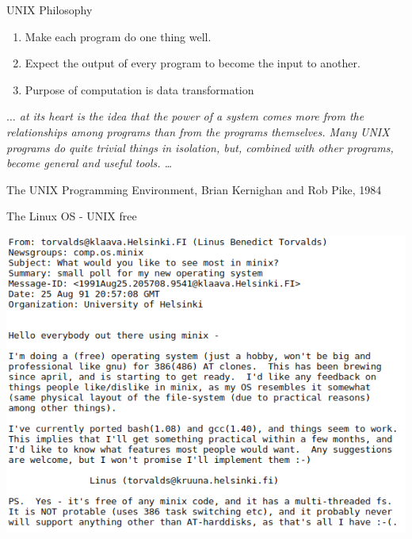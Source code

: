 \documentclass[unknownkeysallowed, 10pt, a4 paper, handout]{beamer}
\begin{document}
\begin{frame}[label=unix]{UNIX Philosophy}
  \begin{enumerate}
    \item Make each program do one thing well. %
    \item Expect the output of every program to become the input to another.
    \item Purpose of computation is data transformation
  \end{enumerate}
  \vfill
  \emph{$\dots$ at its heart is the idea that the power of a system comes
  more from the relationships among programs than from the programs themselves.
  Many UNIX programs do quite trivial things in isolation, but, combined with
  other programs, become general and useful tools. \dots}
  \newline
  \begin{flushright}
  \tiny{The UNIX Programming Environment, Brian Kernighan and Rob Pike, 1984}
  \end{flushright}
\end{frame}

\begin{frame}[label=os]{The Linux OS - UNIX free}
  \begin{center}
    \includegraphics[scale=0.5]{pics/linux-first-announcement-email.png}
  \end{center}
\end{frame}
\end{document}
